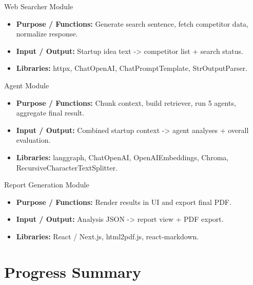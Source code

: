 \documentclass{beamer}
\begin{document}
\begin{frame}{Web Searcher Module}
\small
\begin{itemize}
    \item \textbf{Purpose / Functions:} Generate search sentence, fetch competitor data, normalize response.
    \item \textbf{Input / Output:} Startup idea text -> competitor list + search status.
    \item \textbf{Libraries:} httpx, ChatOpenAI, ChatPromptTemplate, StrOutputParser.
\end{itemize}
\end{frame}

\begin{frame}{Agent Module}
\small
\begin{itemize}
    \item \textbf{Purpose / Functions:} Chunk context, build retriever, run 5 agents, aggregate final result.
    \item \textbf{Input / Output:} Combined startup context -> agent analyses + overall evaluation.
    \item \textbf{Libraries:} langgraph, ChatOpenAI, OpenAIEmbeddings, Chroma, RecursiveCharacterTextSplitter.
\end{itemize}
\end{frame}

\begin{frame}{Report Generation Module}
\small
\begin{itemize}
    \item \textbf{Purpose / Functions:} Render results in UI and export final PDF.
    \item \textbf{Input / Output:} Analysis JSON -> report view + PDF export.
    \item \textbf{Libraries:} React / Next.js, html2pdf.js, react-markdown.
\end{itemize}
\end{frame}

\section{Progress Summary}
\end{document}
